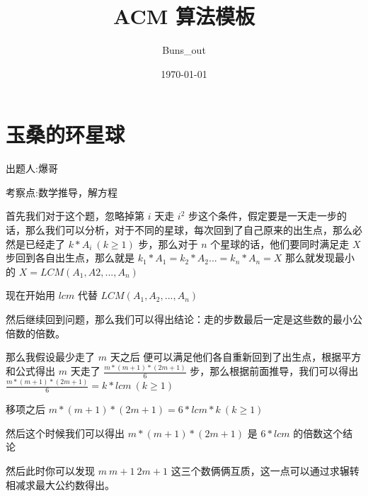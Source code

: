 \documentclass[12pt, a4paper, oneside]{ctexart}
\title{\fontsize{70}{30}\selectfont  ACM 算法模板}
\author{Buns\_out}
\date{\today}
\begin{document}
 



\centering



\newpage
\lstset{language=C++}

\newpage 
\section{玉桑的环星球} 
\flushleft
出题人:爆哥 \par
考察点:数学推导，解方程 \par
\hspace*{\fill} \par
首先我们对于这个题，忽略掉第 $i$ 天走 $i^2$ 步这个条件，假定要是一天走一步的话，那么我们可以分析，对于不同的星球，每次回到了自己原来的出生点，那么必然是已经走了 $k*A_i\ (k\ge1)$ 步，那么对于 $n$ 个星球的话，他们要同时满足走 $X$ 步回到各自出生点，那么就是 $k_1*A_1=k_2*A_2...=k_n*A_n=X$ 那么就发现最小的 $X=LCM(A_1,A2,...,A_n)$ \par
\hspace*{\fill} \par
现在开始用 $lcm$ 代替 $LCM(A_1,A_2,...,A_n)$ \par 
\hspace*{\fill} \par
然后继续回到问题，那么我们可以得出结论：走的步数最后一定是这些数的最小公倍数的倍数。 \par
\hspace*{\fill} \par
那么我假设最少走了 $m$ 天之后 便可以满足他们各自重新回到了出生点，根据平方和公式得出 $m$ 天走了  $\frac{m*(m+1)*(2m+1)}{6}$ 步，那么根据前面推导，我们可以得出 $\frac{m*(m+1)*(2m+1)}{6}=k*lcm\ (k\geq1)$  \par
\hspace*{\fill} \par
移项之后 $m*(m+1)*(2m+1)=6*lcm*k\ (k\geq1)$ \par 
\hspace*{\fill} \par
然后这个时候我们可以得出 $m*(m+1)*(2m+1)$ 是 $6*lcm$ 的倍数这个结论 \par 
\hspace*{\fill} \par
然后此时你可以发现 $m\ m+1 \ 2m+1$  这三个数俩俩互质，这一点可以通过求辗转相减求最大公约数得出。 \par
\end{document}
